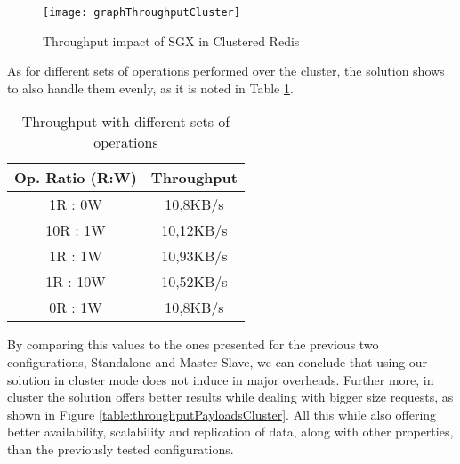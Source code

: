 \begin{figure}[htbp]
	\centering
	{\texttt{[image: graphThroughputCluster]}}
	\caption{Throughput impact of SGX in Clustered Redis}
	\label{fig:graphTroughputCluster}
\end{figure}

\vspace{40mm}

As for different sets of operations performed over the cluster, the solution shows to also handle them evenly, as it is noted in Table \ref{table:thptDiffRatiosClusterRedis}.

\begin{table}[ht]
	\caption{Throughput with different sets of operations} %
	\centering %
	\begin{tabular}{c c} %
		\hline\hline %
		\textbf{Op. Ratio (R:W)} & \textbf{Throughput} \\ [0.3ex] %
		\hline
		1R : 0W & 10,8KB/s\\
		\hline
		10R : 1W & 10,12KB/s \\
		\hline
		1R : 1W & 10,93KB/s\\
		\hline %
		1R : 10W & 10,52KB/s\\
		\hline 
		0R : 1W & 10,8KB/s\\ [0.3ex] %
		\hline %
	\end{tabular}
	\label{table:thptDiffRatiosClusterRedis} %
\end{table}

By comparing this values to the ones presented for the previous two configurations, Standalone and Master-Slave, we can conclude that using our solution in cluster mode does not induce in major overheads. Further more, in cluster the solution offers better results while dealing with bigger size requests, as shown in Figure \ref{table:throughputPayloadsCluster}. All this while also offering better availability, scalability and replication of data, along with other properties, than the previously tested configurations.

